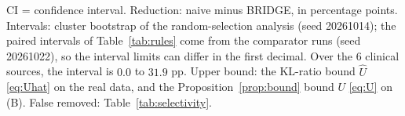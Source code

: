 \begin{table}[!t]
\vspace{2pt}
\parbox{\linewidth}{\justifying\scriptsize CI = confidence interval. Reduction: naive minus BRIDGE, in percentage points. Intervals: cluster bootstrap of the random-selection analysis (seed 20261014); the paired intervals of Table~\ref{tab:rules} come from the comparator runs (seed 20261022), so the interval limits can differ in the first decimal. Over the $6$ clinical sources, the interval is $0.0$ to $31.9$ pp. Upper bound: the KL-ratio bound $\hat U$ \eqref{eq:Uhat} on the real data, and the Proposition~\ref{prop:bound} bound $U$ \eqref{eq:U} on (B). False removed: Table~\ref{tab:selectivity}.}
\end{table}
